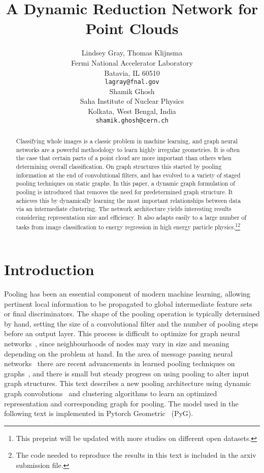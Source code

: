 \documentclass{article}
\title{A Dynamic Reduction Network for Point Clouds}
\author{
  Lindsey Gray, Thomas Klijnsma\\
  Fermi National Accelerator Laboratory\\
  Batavia, IL 60510 \\
  \texttt{lagray@fnal.gov} \\
\And
  Shamik Ghosh \\
  Saha Institute of Nuclear Physics\\
  Kolkata, West Bengal, India \\
  \texttt{shamik.ghosh@cern.ch} \\
}
\begin{document}
\maketitle

\begin{abstract}
Classifying whole images is a classic problem in machine learning, and graph neural networks are a powerful methodology to learn highly irregular geometries.
It is often the case that certain parts of a point cloud are more important than others when determining overall classification.
On graph structures this started by pooling information at the end of convolutional filters, and has evolved to a variety of staged pooling techniques on static graphs.
In this paper, a dynamic graph formulation of pooling is introduced that removes the need for predetermined graph structure.
It achieves this by dynamically learning the most important relationships between data via an intermediate clustering.
The network architecture yields interesting results considering representation size and efficiency. 
It also adapts easily to a large number of tasks from image classification to energy regression in high energy particle physics.\footnote{This preprint will be updated with more studies on different open datasets.}\footnote{The code needed to reproduce the results in this text is included in the arxiv submission file.}
\end{abstract}




\section{Introduction}

Pooling has been an essential component of modern machine learning, allowing pertinent local information to be propagated to global intermediate feature sets or final discriminators.
The shape of the pooling operation is typically determined by hand, setting the size of a convolutional filter and the number of pooling steps before an output layer.
This process is difficult to optimize for graph neural networks~\cite{Bronstein_2017}, since neighbourhoods of nodes may vary in size and meaning depending on the problem at hand.
In the area of message passing neural networks~\cite{gilmer2017neural} there are recent advancements in learned pooling techniques on graphs~\cite{diehl2019edge}, and there is small but steady progress on using pooling to alter input graph structures.
This text describes a new pooling architecture using dynamic graph convolutions~\cite{wang2018dynamic} and clustering algorithms to learn an optimized representation and corresponding graph for pooling.
The model used in the following text is implemented in Pytorch Geometric~\cite{Fey/Lenssen/2019} (PyG).
\end{document}
